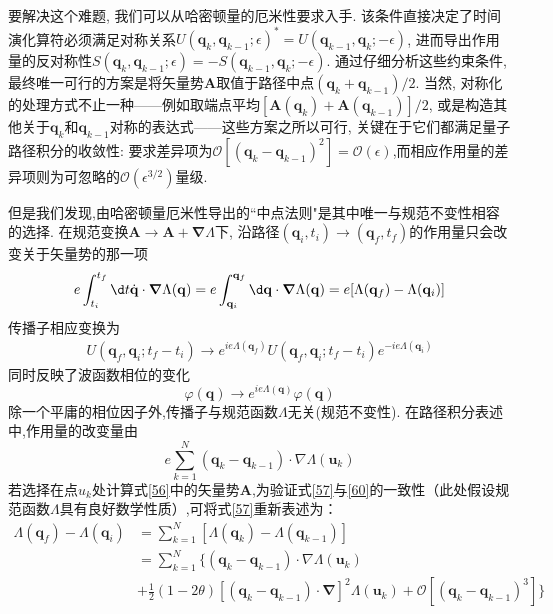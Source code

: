 要解决这个难题, 我们可以从哈密顿量的厄米性要求入手. 该条件直接决定了时间演化算符必须满足对称关系$U(\mathbf{q}_k, \mathbf{q}_{k-1}; \epsilon)^* = U(\mathbf{q}_{k-1}, \mathbf{q}_k; -\epsilon)$, 进而导出作用量的反对称性$S(\mathbf{q}_k, \mathbf{q}_{k-1}; \epsilon) = -S(\mathbf{q}_{k-1}, \mathbf{q}_k; -\epsilon)$. 通过仔细分析这些约束条件, 最终唯一可行的方案是将矢量势$\mathbf{A}$取值于路径中点$(\mathbf{q}_k + \mathbf{q}_{k-1})/2$. 当然, 对称化的处理方式不止一种——例如取端点平均$[\mathbf{A}(\mathbf{q}_k) + \mathbf{A}(\mathbf{q}_{k-1})]/2$, 或是构造其他关于$\mathbf{q}_k$和$\mathbf{q}_{k-1}$对称的表达式——这些方案之所以可行, 关键在于它们都满足量子路径积分的收敛性:
要求差异项为$\mathcal{O}[(\mathbf{q}_k - \mathbf{q}_{k-1})^2] = \mathcal{O}(\epsilon)$,而相应作用量的差异项则为可忽略的$\mathcal{O}(\epsilon^{3/2})$量级.

但是我们发现,由哈密顿量厄米性导出的``中点法则"是其中唯一与规范不变性相容的选择. 在规范变换$\mathbf{A} \to \mathbf{A} + \boldsymbol{\nabla}\Lambda$下, 沿路径$(\mathbf{q}_i, t_i) \to (\mathbf{q}_f, t_f)$的作用量只会改变关于矢量势的那一项
\begin{equation}\label{57}
    e\int_{t_i}^{t_f}\d t\dot{\mathbf{q}}\cdot\boldsymbol{\nabla}\Lambda(\mathbf{q})=e\int_{\mathbf{q}_i}^{\mathbf{q}_f}\d\mathbf{q}\cdot\boldsymbol{\nabla}\Lambda(\mathbf{q})=e[\Lambda(\mathbf{q}_f)-\Lambda(\mathbf{q}_i)]
\end{equation}
传播子相应变换为
\begin{equation}
    \begin{aligned}U(\mathbf{q}_f,\mathbf{q}_i;t_f-t_i)\to e^{ie\Lambda(\mathbf{q}_f)}U(\mathbf{q}_f,\mathbf{q}_i;t_f-t_i)e^{-ie\Lambda(\mathbf{q}_i)}\end{aligned}
\end{equation}
同时反映了波函数相位的变化
\begin{equation}
    \varphi(\mathbf{q})\to e^{ie\Lambda(\mathbf{q})}\varphi(\mathbf{q})
\end{equation}
除一个平庸的相位因子外,传播子与规范函数$\Lambda$无关(规范不变性). 在路径积分表述中,作用量的改变量由
\begin{equation}\label{60}
    e\sum_{k=1}^N(\mathbf{q}_k-\mathbf{q}_{k-1})\cdot\nabla\Lambda(\mathbf{u}_k)
\end{equation}
若选择在点$u_k$处计算式\ref{56}中的矢量势$\mathbf{A}$,为验证式\ref{57}与\ref{60}的一致性（此处假设规范函数$\Lambda$具有良好数学性质）,可将式\ref{57}重新表述为：
\begin{equation}
    \begin{aligned}\Lambda(\mathbf{q}_f)-\Lambda(\mathbf{q}_i)&=\sum_{k=1}^N[\Lambda(\mathbf{q}_k)-\Lambda(\mathbf{q}_{k-1})]\\&=\sum_{k=1}^N\Big\{(\mathbf{q}_k-\mathbf{q}_{k-1})\cdot\nabla\Lambda(\mathbf{u}_k)\\&+\frac{1}{2}(1-2\theta)[(\mathbf{q}_k-\mathbf{q}_{k-1})\cdot\boldsymbol{\nabla}]^2\Lambda(\mathbf{u}_k)+\mathcal{O}[(\mathbf{q}_k-\mathbf{q}_{k-1})^3]\bigg\}\end{aligned}
\end{equation}
